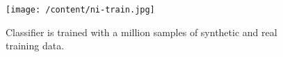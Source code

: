 \begin{figure}
	[h] \hspace{-5 mm} 
	\texttt{[image: /content/ni-train.jpg]} \caption{Classifier is trained with a million samples of synthetic and real training data. \cite{13} } \label{fg:ni:train} 
\end{figure}
